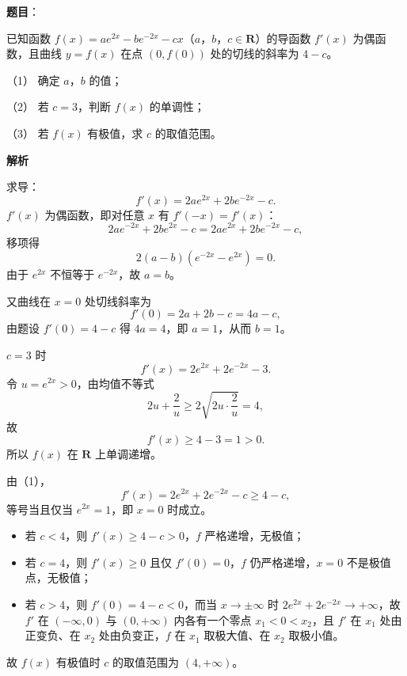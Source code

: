 \begin{answer}

\textbf{题目}：

已知函数 $f(x)=ae^{2x}-be^{-2x}-cx$（$a$，$b$，$c\in\mathbf R$）的导函数 $f'(x)$ 为偶函数，且曲线 $y=f(x)$ 在点 $(0,f(0))$ 处的切线的斜率为 $4-c$。

（1） 确定 $a$，$b$ 的值；

（2） 若 $c=3$，判断 $f(x)$ 的单调性；

（3） 若 $f(x)$ 有极值，求 $c$ 的取值范围。

\textbf{解析}


求导：
\nopagebreak[4]
\[f'(x)=2ae^{2x}+2be^{-2x}-c .\]
$f'(x)$ 为偶函数，即对任意 $x$ 有 $f'(-x)=f'(x)$：
\nopagebreak[4]
\[2ae^{-2x}+2be^{2x}-c=2ae^{2x}+2be^{-2x}-c,\]
移项得
\nopagebreak[4]
\[2(a-b)\left(e^{-2x}-e^{2x}\right)=0 .\]
由于 $e^{2x}$ 不恒等于 $e^{-2x}$，故 $a=b$。

又曲线在 $x=0$ 处切线斜率为
\nopagebreak[4]
\[f'(0)=2a+2b-c=4a-c,\]
由题设 $f'(0)=4-c$ 得 $4a=4$，即 $a=1$，从而 $b=1$。


$c=3$ 时
\nopagebreak[4]
\[f'(x)=2e^{2x}+2e^{-2x}-3 .\]
令 $u=e^{2x}>0$，由均值不等式
\nopagebreak[4]
\[2u+\frac2u\geqslant2\sqrt{2u\cdot\frac2u}=4,\]
故
\nopagebreak[4]
\[f'(x)\geqslant4-3=1>0 .\]
所以 $f(x)$ 在 $\mathbf R$ 上单调递增。


由（1），
\nopagebreak[4]
\[f'(x)=2e^{2x}+2e^{-2x}-c\geqslant4-c,\]
等号当且仅当 $e^{2x}=1$，即 $x=0$ 时成立。

\begin{itemize}
\item 若 $c<4$，则 $f'(x)\geqslant4-c>0$，$f$ 严格递增，无极值；
\item 若 $c=4$，则 $f'(x)\geqslant0$ 且仅 $f'(0)=0$，$f$ 仍严格递增，$x=0$ 不是极值点，无极值；
\item 若 $c>4$，则 $f'(0)=4-c<0$，而当 $x\to\pm\infty$ 时 $2e^{2x}+2e^{-2x}\to+\infty$，故 $f'$ 在 $(-\infty,0)$ 与 $(0,+\infty)$ 内各有一个零点 $x_1<0<x_2$，且 $f'$ 在 $x_1$ 处由正变负、在 $x_2$ 处由负变正，$f$ 在 $x_1$ 取极大值、在 $x_2$ 取极小值。
\end{itemize}

故 $f(x)$ 有极值时 $c$ 的取值范围为 $(4,+\infty)$。




\end{answer}
